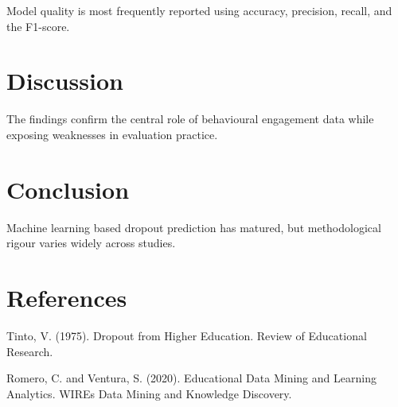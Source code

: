 \documentclass[12pt]{article}
\begin{document}
Model quality is most frequently reported using accuracy, precision, recall, and the F1-score.

\section{Discussion}

The findings confirm the central role of behavioural engagement data while exposing weaknesses in evaluation practice.

\section{Conclusion}

Machine learning based dropout prediction has matured, but methodological rigour varies widely across studies.

\section{References}

Tinto, V. (1975). Dropout from Higher Education. Review of Educational Research.

Romero, C. and Ventura, S. (2020). Educational Data Mining and Learning Analytics. WIREs Data Mining and Knowledge Discovery.
\end{document}
